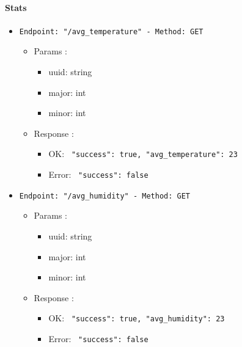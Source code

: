 \paragraph{Stats}

\begin{itemize}
  \item \texttt{Endpoint: "/avg_temperature" -  Method: GET}
  \begin{itemize} 
    \item Params :
    \begin{itemize}
      \item uuid: string
      \item major: int
      \item minor: int
    \end{itemize}

    \item Response : 
    \begin{itemize}
      \item OK: \texttt{{ "success": true, "avg_temperature": 23 }}
      \item Error: \texttt{{ "success": false }}
    \end{itemize}
  \end{itemize}
\end{itemize}

\begin{itemize}
  \item \texttt{Endpoint: "/avg_humidity" -  Method: GET}
  \begin{itemize} 
    \item Params :
    \begin{itemize}
      \item uuid: string
      \item major: int
      \item minor: int
    \end{itemize}

    \item Response : 
    \begin{itemize}
      \item OK: \texttt{{ "success": true, "avg_humidity": 23 }}
      \item Error: \texttt{{ "success": false }}
    \end{itemize}
  \end{itemize}
\end{itemize}

